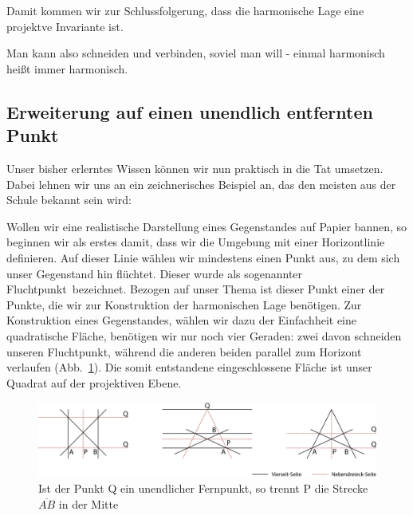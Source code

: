 \documentclass[12pt,a4paper]{article}
\begin{document}
Damit kommen wir zur Schlussfolgerung, dass die harmonische Lage eine projektve Invariante ist.

\glqq Man kann also schneiden und verbinden, soviel man will - einmal harmonisch heißt immer harmonisch.~\citep[s.~][S.~49]{projektiveGeometrie}\grqq

\newpage
\subsection{Erweiterung auf einen unendlich entfernten Punkt}

Unser bisher erlerntes Wissen können wir nun praktisch in die Tat umsetzen. Dabei lehnen wir uns an ein zeichnerisches Beispiel an, das den meisten aus der Schule bekannt sein wird:

Wollen wir eine realistische Darstellung eines Gegenstandes auf Papier bannen, so beginnen wir als erstes damit, dass wir die Umgebung mit einer Horizontlinie definieren. Auf dieser Linie wählen wir mindestens einen Punkt aus, zu dem sich unser Gegenstand hin \glqq flüchtet\grqq . Dieser wurde als sogenannter \glqq Fluchtpunkt\grqq ~bezeichnet. Bezogen auf unser Thema ist dieser Punkt einer der Punkte, die wir zur Konstruktion der harmonischen Lage benötigen. Zur Konstruktion eines Gegenstandes, wählen wir dazu der Einfachheit eine quadratische Fläche, benötigen wir nur noch vier Geraden: zwei davon schneiden unseren Fluchtpunkt, während die anderen beiden parallel zum Horizont verlaufen (Abb.~\ref{fig:inftyPoint}). Die somit entstandene eingeschlossene Fläche ist unser Quadrat auf der projektiven Ebene.

\begin{figure}[htbp]
\centering
\includegraphics[width=\textwidth]{Bilder/inftyPoint.png}
\caption{Ist der Punkt Q ein unendlicher Fernpunkt, so trennt P die Strecke $\overline{A B}$ in der Mitte}
\label{fig:inftyPoint}
\end{figure}
\end{document}
